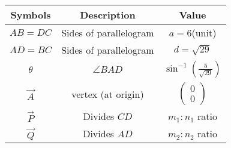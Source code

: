 \begin{tabular}{|c|c|c|}
\hline
    \textbf{Symbols} &\textbf{Description}&\textbf{Value} \\
    \hline
     $AB = DC$& Sides of parallelogram &$a = 6$(unit)\\
     \hline
     $AD = BC$& Sides of parallelogram &$d = \sqrt{29}$\\
     \hline
     
     $\theta$& $\angle BAD $& $\sin^{-1}(\frac{5}{\sqrt{29}})$\\
     \hline
     $\vec{A}$& vertex (at origin) &$\begin{pmatrix}
     0\\0
     \end{pmatrix}$\\
     \hline
     $\vec{ P}$& Divides $CD$ &$m_1:n_1$ ratio\\
     \hline
      $\vec{Q}$& Divides $AD$ &$m_2:n_2$ ratio\\
     \hline
     
     
\end{tabular}
